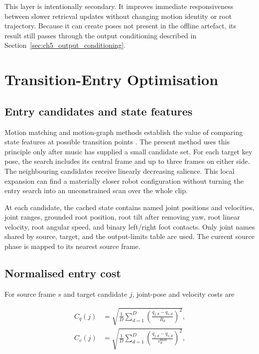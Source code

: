 This layer is intentionally secondary. It improves immediate responsiveness
between slower retrieval updates without changing motion identity or root
trajectory. Because it can create poses not present in the offline artefact,
its result still passes through the output conditioning described in
Section~\ref{sec:ch5_output_conditioning}.

\section{Transition-Entry Optimisation}
\label{sec:ch5_entry_optimisation}

\subsection{Entry candidates and state features}
\label{subsec:ch5_entry_candidates}

Motion matching and motion-graph methods establish the value of comparing
state features at possible transition points
\cite{kovar2023motion,holden2020learned}. The present method uses this principle
only after music has supplied a small candidate set. For each target key pose,
the search includes its central frame and up to three frames on either side.
The neighbouring candidates receive linearly decreasing salience. This local
expansion can find a materially closer robot configuration without turning the
entry search into an unconstrained scan over the whole clip.

At each candidate, the cached state contains named joint positions and
velocities, joint ranges, grounded root position, root tilt after removing yaw,
root linear velocity, root angular speed, and binary left/right foot contacts.
Only joint names shared by source, target, and the output-limits table are used.
The current source phase is mapped to its nearest source frame.

\subsection{Normalised entry cost}
\label{subsec:ch5_entry_cost}

For source frame $s$ and target candidate $j$, joint-pose and velocity costs are

\begin{align}
    C_q(j)&=\sqrt{\frac{1}{D}\sum_{d=1}^{D}
      \left(\frac{q_{j,d}-q_{s,d}}{R_d}\right)^2},\\
    C_v(j)&=\sqrt{\frac{1}{D}\sum_{d=1}^{D}
      \left(\frac{\dot q_{j,d}-\dot q_{s,d}}
      {v_d^{\max}}\right)^2},
    \label{eq:ch5_pose_velocity_costs}
\end{align}

